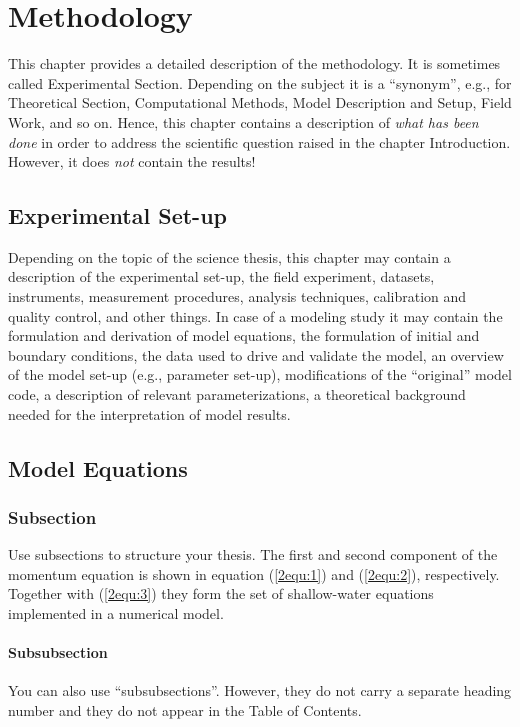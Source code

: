 \chapter{Methodology}\label{chap2}
\thispagestyle{plain}

This chapter provides a detailed description of the methodology. It is
sometimes called Experimental Section. Depending on the subject it is a
``synonym'', e.g., for Theoretical Section, Computational Methods, Model
Description and Setup, Field Work, and so on. Hence, this chapter contains a
description of \emph{what has been done} in order to address the scientific
question raised in the chapter Introduction. However, it does \emph{not} contain
the results! 


\section{Experimental Set-up}\label{2sec:1}
Depending on the topic of the science thesis, this chapter may contain a
description of the experimental set-up, the field experiment,
datasets, instruments, measurement procedures, analysis techniques, calibration
and quality control, and other things. In case of a modeling study it may
contain the formulation and derivation of model equations, the formulation of
initial and boundary conditions, the data used to drive and validate the model,
an overview of the model set-up (e.g., parameter set-up), modifications of the
``original'' model code, a description of relevant parameterizations,
a theoretical background needed for the interpretation of model results.


\section{Model Equations}\label{2sec:2}

\subsection{Subsection}
Use subsections to structure your thesis. The first and second component of the
momentum equation is shown in equation (\ref{2equ:1}) and (\ref{2equ:2}),
respectively. Together with (\ref{2equ:3}) they form the set of shallow-water
equations implemented in a numerical model.

\subsubsection{Subsubsection}
You can also use ``subsubsections''. However, they do not carry a separate
heading number and they do not appear in the Table of Contents.

